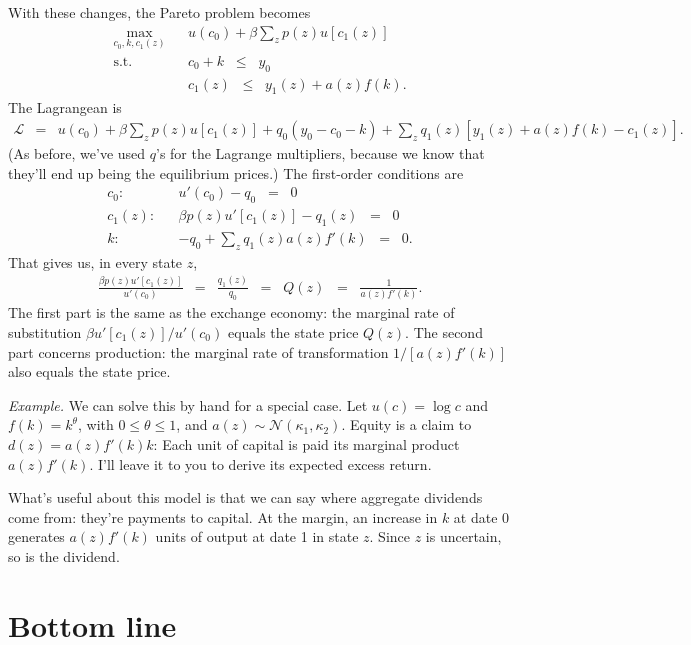 \documentclass[11pt]{article}
\begin{document}
With these changes, the Pareto problem becomes
\begin{eqnarray*}
    \max_{c_0,k, c_1(z)} && u(c_0) + \beta \sum_z p(z) u[c_1(z)] \\
    \mbox{s.t.}   &&  c_0  + k \;\;\leq\;\; y_0 \\
                  &&  c_1(z) \;\;\leq\;\; y_1(z) + a(z) f(k) .
\end{eqnarray*}
The Lagrangean is
\begin{eqnarray*}
    \mathcal{L} &=&  u(c_0) + \beta \sum_z p(z) u[c_1(z)] + q_0 (y_0 - c_0 - k)
                    + \sum_z q_1(z)  [ y_1(z) + a(z) f(k) - c_1(z)]  .
\end{eqnarray*}
(As before, we've used $q$'s for the Lagrange multipliers,
because we know that they'll end up being the equilibrium prices.)
The first-order conditions are
\begin{eqnarray*}
    c_0: &&  u'(c_0) - q_0 \;\;=\;\; 0 \\
    c_1(z): &&  \beta p(z) u'[c_1(z)] - q_1(z) \;\;=\;\; 0 \\
     k:   && - q_0 + \sum_z q_1(z) a(z) f'(k) \;\;=\;\; 0 .
\end{eqnarray*}
That gives us, in every state $z$,
\begin{eqnarray*}
    \frac{\beta p(z) u'[c_1(z)]}{u'(c_0)} &=& \frac{q_1(z)}{q_0}
    \;\;=\;\; Q(z)
    \;\;=\;\; \frac{1}{a(z) f'(k)} .
\end{eqnarray*}
The first part is the same as the exchange economy:
the marginal rate of substitution $\beta u'[c_1(z)]/u'(c_0)$
equals the state price $Q(z)$.
The second part concerns production:
the marginal rate of transformation $ 1 / [a(z) f'(k)]$ also equals the state price.

{\it Example.\/}
We can solve this by hand for a special case.
Let $u(c) = \log c$ and $f(k) = k^\theta$, with
$0 \leq \theta \leq 1$,
and $a(z) \sim \mathcal{N}(\kappa_1,\kappa_2)$.
Equity is a claim to $d(z) = a(z) f'(k) k$:
Each unit of capital is paid its marginal product $a(z) f'(k)$.
I'll leave it to you to derive its expected excess return.


What's useful about this model is that we can say where
aggregate dividends come from:
they're payments to capital.
At the margin,
an increase in $k$ at date 0 generates $a(z) f'(k)$ units of
output at date 1 in state $z$.
Since $z$ is uncertain, so is the dividend.


\section*{Bottom line}
\end{document}
